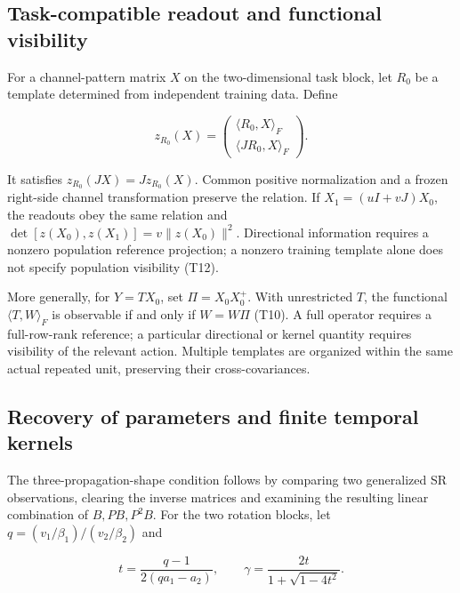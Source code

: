 \documentclass[11pt,a4paper]{article}
\begin{document}
\subsection{Task-compatible readout and functional
visibility}\label{task-compatible-readout-and-functional-visibility}

\par
\noindent\begin{minipage}{\linewidth}

For a channel-pattern matrix \(X\) on the two-dimensional task block,
let \(R_0\) be a template determined from independent training data.
Define

\[
z_{R_0}(X)=
\begin{pmatrix}
\langle R_0,X\rangle_F\\
\langle JR_0,X\rangle_F
\end{pmatrix}.
\]

\end{minipage}\par

It satisfies \(z_{R_0}(JX)=Jz_{R_0}(X)\). Common positive normalization
and a frozen right-side channel transformation preserve the relation. If
\(X_1=(uI+vJ)X_0\), the readouts obey the same relation and
\(\det[z(X_0),z(X_1)]=v\|z(X_0)\|^2\). Directional information requires
a nonzero population reference projection; a nonzero training template
alone does not specify population visibility (T12).

More generally, for \(Y=TX_0\), set \(\Pi=X_0X_0^+\). With unrestricted
\(T\), the functional \(\langle T,W\rangle_F\) is observable if and only
if \(W=W\Pi\) (T10). A full operator requires a full-row-rank reference;
a particular directional or kernel quantity requires visibility of the
relevant action. Multiple templates are organized within the same actual
repeated unit, preserving their cross-covariances.

\subsection{Recovery of parameters and finite temporal
kernels}\label{recovery-of-parameters-and-finite-temporal-kernels}

\par
\noindent\begin{minipage}{\linewidth}

The three-propagation-shape condition follows by comparing two
generalized SR observations, clearing the inverse matrices and examining
the resulting linear combination of \(B,PB,P^2B\). For the two rotation
blocks, let \(q=(v_1/\beta_1)/(v_2/\beta_2)\) and

\[
t=\frac{q-1}{2(qa_1-a_2)},\qquad
\gamma=\frac{2t}{1+\sqrt{1-4t^2}}.
\]

\end{minipage}\par
\end{document}
